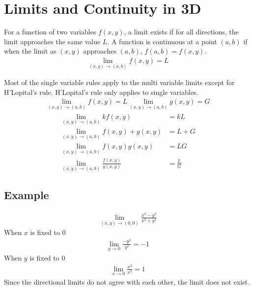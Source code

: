 \documentclass{article}
\theoremstyle{mytheoremstyle}
\theoremstyle{mytheoremstyle}
\theoremstyle{myproblemstyle}
\begin{document}
    \section*{Limits and Continuity in 3D}
    For a function of two variables $f(x,y)$, a limit exists if for all
    directions, the limit approaches the same value $L$. A function is
    continuous at a point $(a,b)$ if when the limit as $(x,y)$ approaches
    $(a,b)$, $f(a,b)=f(x,y)$.
    \begin{align*}
        \lim_{(x,y)\to (a,b)} f(x,y) = L
    \end{align*}

    Most of the single variable rules apply to the multi variable limits except
    for H'Lopital's rule. H'Lopital's rule only applies to single variables.
    \begin{align*}
        \lim_{(x,y)\rightarrow(a,b)} f(x,y) = L
        \lim_{(x,y)\rightarrow(a,b)} g(x,y) = G
    \end{align*}
    \begin{align*}
        \lim_{(x,y)\rightarrow(a,b)} kf(x,y) &= kL \\
        \lim_{(x,y)\rightarrow(a,b)} f(x,y) + g(x,y) &= L + G \\
        \lim_{(x,y)\rightarrow(a,b)} f(x,y)g(x,y) &= LG \\
        \lim_{(x,y)\rightarrow(a,b)} \frac{f(x,y)}{g(x,y)} &= \frac{L}{G}
    \end{align*}

    \subsection*{Example}
    \begin{align*}
        \lim_{(x,y)\to (0,0)} \frac{x^2-y^2}{x^2+y^2}
    \end{align*}
    When $x$ is fixed to $0$
    \begin{align*}
        \lim_{y\to 0} \frac{-y^2}{y^2} = -1
    \end{align*}
    When $y$ is fixed to $0$
    \begin{align*}
        \lim_{x\to 0} \frac{x^2}{x^2} = 1
    \end{align*}
    Since the directional limits do not agree with each other, the limit does
    not exist.
\end{document}
